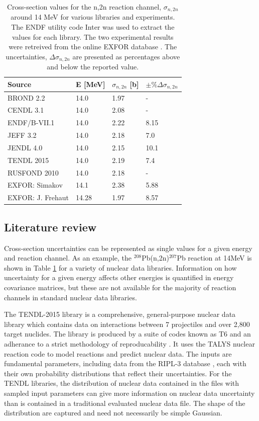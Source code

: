 \begin{table}[ht]
  \footnotesize
  \centering
  \begin{tabular}{llll}
    \toprule
    Source & E [MeV] & $\sigma_{n,2n}$ [b] & $\pm\%\Delta\sigma_{n,2n}$ \\
    \midrule
    BROND 2.2 & 14.0 & 1.97 & - \\
    CENDL 3.1 & 14.0 & 2.08 & - \\
    ENDF/B-VII.1 & 14.0 & 2.22 & 8.15 \\
    JEFF 3.2 & 14.0 & 2.18 & 7.0 \\
    JENDL 4.0 & 14.0 & 2.15 & 10.1 \\
    TENDL 2015 & 14.0 & 2.19 & 7.4 \\
    RUSFOND 2010 & 14.0 & 2.18 & - \\
    EXFOR: Simakov & 14.1 & 2.38 & 5.88 \\
    EXFOR: J. Frehaut & 14.28 & 1.97 & 8.57 \\
    \bottomrule
  \end{tabular}
  \caption{Cross-section values for the n,2n reaction channel, $\sigma_{n,2n}$ around 14 MeV for various libraries and experiments. The ENDF utility code Inter \cite{inter} was used to extract the values for each library. The two experimental results were retreived from the online EXFOR database \cite{exfor2017}. The uncertainties, $\Delta\sigma_{n,2n}$ are presented as percentages above and below the reported value.}
  \label{tab:lead_by_lib}
\end{table}

\subsection{Literature review}


Cross-section uncertainties can be represented as single values for a given energy and reaction channel. As an example, the $^{208}$Pb(n,2n)$^{207}$Pb reaction at 14MeV is shown in Table \ref{tab:lead_by_lib} for a variety of nuclear data libraries. Information on how uncertainty for a given energy affects other energies is quantified in energy covariance matrices, but these are not available for the majority of reaction channels in standard nuclear data libraries.

The TENDL-2015 library is a comprehensive, general-purpose nuclear data library which contains data on interactions between 7 projectiles and over 2,800 target nuclides. The library is produced by a suite of codes known as T6 and an adherance to a strict methodology of reproducability \cite{Rochman2016}. It uses the TALYS nuclear reaction code to model reactions and predict nuclear data. The inputs are fundamental parameters, including data from the RIPL-3 database \cite{RIPL3}, each with their own probability distributions that reflect their uncertainties. For the TENDL libraries, the distribution of nuclear data contained in the files with sampled input parameters can give more information on nuclear data uncertainty than is contained in a traditional evaluated nuclear data file. The shape of the distribution are captured and need not necessarily be simple Gaussian.

